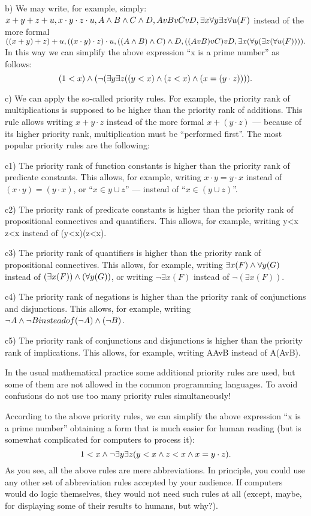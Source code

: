 b) We may write, for example, simply: \(x+y+z+u, x\cdot y\cdot z\cdot u, A\wedge B\wedge C\wedge D, AvBvCvD, \exists x\forall y\exists z\forall u(F)\) instead of the more formal \(((x+y)+z)+u, ((x\cdot y)\cdot z)\cdot u, ((A\wedge B)\wedge C)\wedge D, ((AvB)vC)vD, \exists x(\forall y(\exists z(\forall u(F)))).\) In this way we can simplify the above expression ``x is a prime number'' as follows:
\[
(1<x)\wedge (\neg (\exists y\exists z((y<x)\wedge (z<x)\wedge (x=(y\cdot z)))).
\]

c) We can apply the so-called priority rules. For example, the priority rank of multiplications is supposed to be higher than the priority rank of additions. This rule allows writing \(x+y\cdot z\) instead of the more formal \(x+(y\cdot z)\) --- because of its higher priority rank, multiplication must be ``performed first''. The most popular priority rules are the following:

c1) The priority rank of function constants is higher than the priority rank of predicate constants. This allows, for example, writing \(x\cdot y = y\cdot x\) instead of \((x\cdot y)=(y\cdot x)\), or ``\(x\in y\cup z\)'' --- instead of ``\(x\in (y\cup z)\)''.

c2) The priority rank of predicate constants is higher than the priority rank of propositional connectives and quantifiers. This allows, for example, writing y<x \AND  z<x instead of (y<x)\AND (z<x).

c3) The priority rank of quantifiers is higher than the priority rank of propositional connectives. This allows, for example, writing \(\exists x(F)\wedge \forall y(G)\) instead of \((\exists x(F))\wedge (\forall y(G))\), or writing \(\neg \exists x(F)\) instead of \(\neg (\exists x(F))\).

c4) The priority rank of negations is higher than the priority rank of conjunctions and disjunctions. This allows, for example, writing \(\neg A\wedge \neg B instead of (\neg A)\wedge (\neg B)\).

c5) The priority rank of conjunctions and disjunctions is higher than the priority rank of implications. This allows, for example, writing A\IMPLIES AvB instead of A\IMPLIES (AvB).

In the usual mathematical practice some additional priority rules are used, but some of them are not allowed in the common programming languages. To avoid confusions do not use too many priority rules simultaneously!

According to the above priority rules, we can simplify the above expression ``x is a prime number'' obtaining a form that is much easier for human reading (but is somewhat complicated for computers to process it):
\[
1<x \wedge  \neg \exists y\exists z(y<x \wedge  z<x \wedge  x=y\cdot z).
\]
As you see, all the above rules are mere abbreviations. In principle, you could use any other set of abbreviation rules accepted by your audience. If computers would do logic themselves, they would not need such rules at all (except, maybe, for displaying some of their results to humans, but why?).


